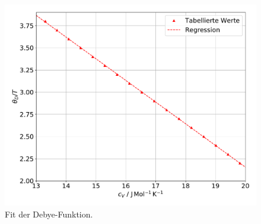 \begin{figure}[h!]
  \centering
  \includegraphics[scale=0.3]{Debeye.pdf}
  \caption{Fit der Debye-Funktion.}
  \label{A_abb:4}
\end{figure}

